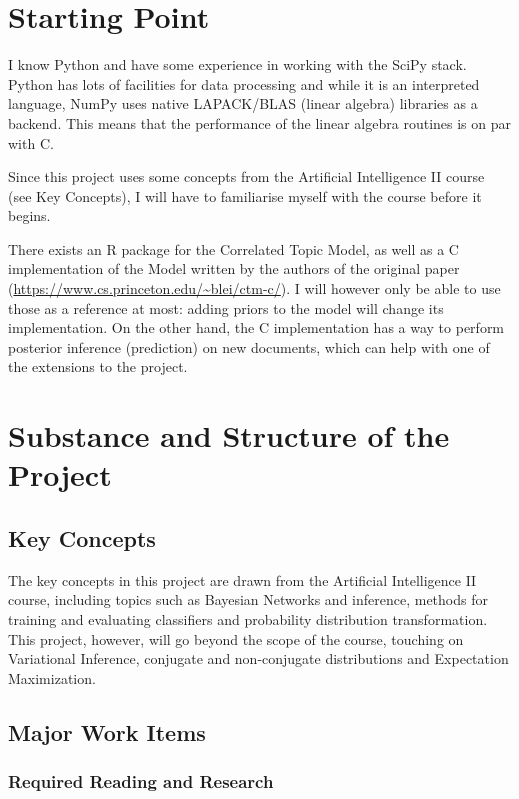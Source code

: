 \documentclass[12pt,a4]{article}
\begin{document}
\section*{Starting Point}

I know Python and have some experience in working with the SciPy stack. Python has lots of facilities for data processing and while it is an interpreted language, NumPy uses native LAPACK/BLAS (linear algebra) libraries as a backend. This means that the performance of the linear algebra routines is on par with C.

Since this project uses some concepts from the Artificial Intelligence II course (see Key Concepts), I will have to familiarise myself with the course before it begins.

There exists an R package for the Correlated Topic Model, as well as a C implementation of the Model written by the authors of the original paper (\url{https://www.cs.princeton.edu/~blei/ctm-c/}). I will however only be able to use those as a reference at most: adding priors to the model will change its implementation. On the other hand, the C implementation has a way to perform posterior inference (prediction) on new documents, which can help with one of the extensions to the project.

\section*{Substance and Structure of the Project}

\subsection*{Key Concepts}

The key concepts in this project are drawn from the Artificial Intelligence II course, including topics such as Bayesian Networks and inference, methods for training and evaluating classifiers and probability distribution transformation. This project, however, will go beyond the scope of the course, touching on Variational Inference, conjugate and non-conjugate distributions and Expectation Maximization.

\subsection*{Major Work Items}

\subsubsection*{Required Reading and Research}
\end{document}
